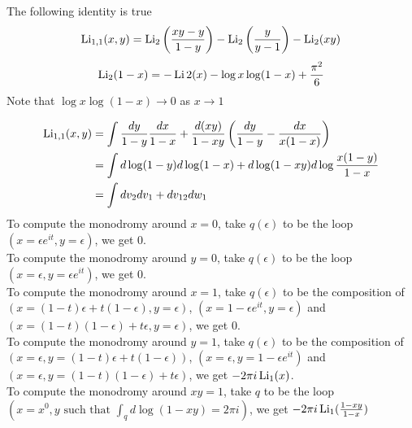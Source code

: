 \documentclass[main]{subfiles}
\begin{document}
The following identity is true
\[\operatorname{Li}_{1,1}(x,y)=\operatorname{Li}_2\left(\frac{xy-y}{1-y}\right)-\operatorname{Li}_2\left(\frac{y}{y-1}\right)-\operatorname{Li}_2(xy)\]
\[\operatorname{Li}_2(1-x)=-\operatorname{Li}2(x)-\log x\log(1-x)+\frac{\pi^2}{6}\]
Note that $\log x\log(1-x)\to0$ as $x\to 1$

\begin{align*}
\operatorname{Li}_{1,1}(x,y)&=\int \frac{dy}{1-y}\frac{dx}{1-x}+\frac{d(xy)}{1-xy}\left(\frac{dy}{1-y}-\frac{dx}{x(1-x)}\right) \\
&=\int d\log(1-y)d\log(1-x)+d\log(1-xy)d\log\frac{x(1-y)}{1-x} \\
&=\int dv_2dv_1+dv_{12}dw_1
\end{align*}
To compute the monodromy around $x=0$, take $q(\epsilon)$ to be the loop $(x=\epsilon e^{it},y=\epsilon)$, we get $0$. \\
To compute the monodromy around $y=0$, take $q(\epsilon)$ to be the loop $(x=\epsilon,y=\epsilon e^{it})$, we get $0$. \\
To compute the monodromy around $x=1$, take $q(\epsilon)$ to be the composition of $(x=(1-t)\epsilon+t(1-\epsilon),y=\epsilon)$, $(x=1-\epsilon e^{it},y=\epsilon)$ and $(x=(1-t)(1-\epsilon)+t\epsilon,y=\epsilon)$, we get $0$. \\
To compute the monodromy around $y=1$, take $q(\epsilon)$ to be the composition of $(x=\epsilon,y=(1-t)\epsilon+t(1-\epsilon))$, $(x=\epsilon,y=1-\epsilon e^{it})$ and $(x=\epsilon,y=(1-t)(1-\epsilon)+t\epsilon)$, we get $-2\pi i\operatorname{Li}_1(x)$. \\
To compute the monodromy around $xy=1$, take $q$ to be the loop $(x=x^0,y\text{ such that }\int_qd\log(1-xy)=2\pi i)$, we get $-2\pi i\operatorname{Li}_1(\frac{1-xy}{1-x})$
\end{document}
